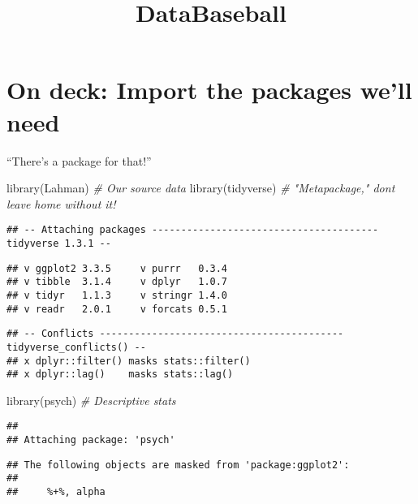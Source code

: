 \documentclass[
]{article}
\title{DataBaseball}
\author{}
\date{\vspace{-2.5em}}
\newenvironment{Shaded}{\begin{snugshade}}{\end{snugshade}}
\newcommand{\CommentTok}[1]{\textcolor[rgb]{0.56,0.35,0.01}{\textit{#1}}}
\newcommand{\FunctionTok}[1]{\textcolor[rgb]{0.00,0.00,0.00}{#1}}
\newcommand{\NormalTok}[1]{#1}
\begin{document}
\maketitle

\hypertarget{on-deck-import-the-packages-well-need}{%
\section{On deck: Import the packages we'll
need}\label{on-deck-import-the-packages-well-need}}

``There's a package for that!''

\begin{Shaded}
\begin{Highlighting}[]
\FunctionTok{library}\NormalTok{(Lahman) }\CommentTok{\# Our source data}
\FunctionTok{library}\NormalTok{(tidyverse)  }\CommentTok{\# "Metapackage," don\textquotesingle{}t leave home without it!}
\end{Highlighting}
\end{Shaded}

\begin{verbatim}
## -- Attaching packages --------------------------------------- tidyverse 1.3.1 --
\end{verbatim}

\begin{verbatim}
## v ggplot2 3.3.5     v purrr   0.3.4
## v tibble  3.1.4     v dplyr   1.0.7
## v tidyr   1.1.3     v stringr 1.4.0
## v readr   2.0.1     v forcats 0.5.1
\end{verbatim}

\begin{verbatim}
## -- Conflicts ------------------------------------------ tidyverse_conflicts() --
## x dplyr::filter() masks stats::filter()
## x dplyr::lag()    masks stats::lag()
\end{verbatim}

\begin{Shaded}
\begin{Highlighting}[]
\FunctionTok{library}\NormalTok{(psych)  }\CommentTok{\# Descriptive stats}
\end{Highlighting}
\end{Shaded}

\begin{verbatim}
## 
## Attaching package: 'psych'
\end{verbatim}

\begin{verbatim}
## The following objects are masked from 'package:ggplot2':
## 
##     %+%, alpha
\end{verbatim}
\end{document}
